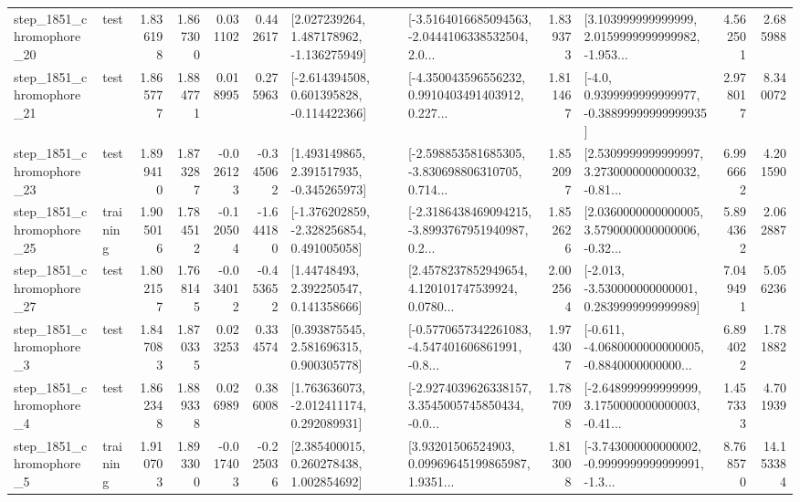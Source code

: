 \begin{tabular}{llrrrrllrlrr}
 step\_1851\_chromophore\_20 &      test &      1.836198 &    1.867300 &      0.031102 &  0.442617 &    [2.027239264, 1.487178962, -1.136275949] &  [-3.5164016685094563, -2.0444106338532504, 2.0... &       1.839373 &  [3.103999999999999, 2.0159999999999982, -1.953... &            4.562501 &          2.685988 \\
 step\_1851\_chromophore\_21 &      test &      1.865777 &    1.884771 &      0.018995 &  0.275963 &   [-2.614394508, 0.601395828, -0.114422366] &  [-4.350043596556232, 0.9910403491403912, 0.227... &       1.811467 &   [-4.0, 0.9399999999999977, -0.38899999999999935] &            2.978017 &          8.340072 \\
 step\_1851\_chromophore\_23 &      test &      1.899410 &    1.873287 &     -0.026123 & -0.345062 &    [1.493149865, 2.391517935, -0.345265973] &  [-2.598853581685305, -3.830698806310705, 0.714... &       1.852097 &  [2.5309999999999997, 3.2730000000000032, -0.81... &            6.996662 &          4.201590 \\
 step\_1851\_chromophore\_25 &  training &      1.905016 &    1.784512 &     -0.120504 & -1.644180 &   [-1.376202859, -2.328256854, 0.491005058] &  [-2.3186438469094215, -3.8993767951940987, 0.2... &       1.852626 &  [2.0360000000000005, 3.5790000000000006, -0.32... &            5.894362 &          2.062887 \\
 step\_1851\_chromophore\_27 &      test &      1.802157 &    1.768145 &     -0.034012 & -0.453652 &      [1.44748493, 2.392250547, 0.141358666] &  [2.4578237852949654, 4.120101747539924, 0.0780... &       2.002564 &   [-2.013, -3.530000000000001, 0.2839999999999989] &            7.049491 &          5.056236 \\
  step\_1851\_chromophore\_3 &      test &      1.847083 &    1.870335 &      0.023253 &  0.334574 &     [0.393875545, 2.581696315, 0.900305778] &  [-0.5770657342261083, -4.547401606861991, -0.8... &       1.974307 &  [-0.611, -4.0680000000000005, -0.8840000000000... &            6.894022 &          1.781882 \\
  step\_1851\_chromophore\_4 &      test &      1.862348 &    1.889338 &      0.026989 &  0.386008 &    [1.763636073, -2.012411174, 0.292089931] &  [-2.9274039626338157, 3.3545005745850434, -0.0... &       1.787098 &  [-2.648999999999999, 3.1750000000000003, -0.41... &            1.457333 &          4.701939 \\
  step\_1851\_chromophore\_5 &  training &      1.910703 &    1.893300 &     -0.017403 & -0.225036 &     [2.385400015, 0.260278438, 1.002854692] &  [3.93201506524903, 0.09969645199865987, 1.9351... &       1.813008 &  [-3.743000000000002, -0.9999999999999991, -1.3... &            8.768570 &         14.153384 \\

\end{tabular}

